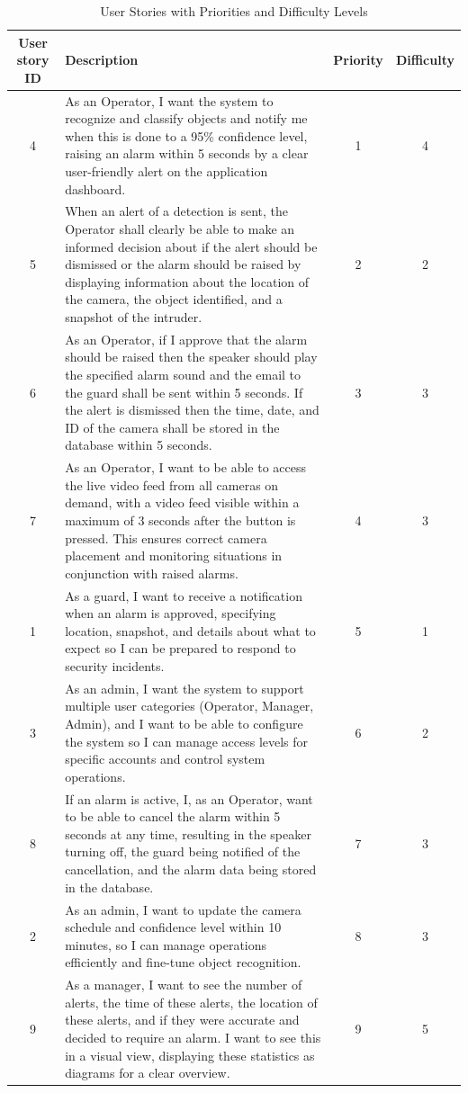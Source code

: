 \documentclass{article}
\begin{document}
\begin{table}[htbp]
\centering
\normalsize
\begin{tabular}{|c|p{10cm}|c|c|}
\hline
\textbf{User story ID} & \textbf{Description} & \textbf{Priority} & \textbf{Difficulty} \\
\hline
4 & As an Operator, I want the system to recognize and classify objects and notify me when this is done to a 95\% confidence level, raising an alarm within 5 seconds by a clear user-friendly alert on the application dashboard. & 1 & 4 \\
\hline
5 & When an alert of a detection is sent, the Operator shall clearly be able to make an informed decision about if the alert should be dismissed or the alarm should be raised by displaying information about the location of the camera, the object identified, and a snapshot of the intruder. & 2 & 2 \\
\hline
6 & As an Operator, if I approve that the alarm should be raised then the speaker should play the specified alarm sound and the email to the guard shall be sent within 5 seconds. If the alert is dismissed then the time, date, and ID of the camera shall be stored in the database within 5 seconds. & 3 & 3 \\
\hline
7 & As an Operator, I want to be able to access the live video feed from all cameras on demand, with a video feed visible within a maximum of 3 seconds after the button is pressed. This ensures correct camera placement and monitoring situations in conjunction with raised alarms. & 4 & 3 \\
\hline
1 & As a guard, I want to receive a notification when an alarm is approved, specifying location, snapshot, and details about what to expect so I can be prepared to respond to security incidents. & 5 & 1 \\
\hline
3 & As an admin, I want the system to support multiple user categories (Operator, Manager, Admin), and I want to be able to configure the system so I can manage access levels for specific accounts and control system operations. & 6 & 2 \\
\hline
8 & If an alarm is active, I, as an Operator, want to be able to cancel the alarm within 5 seconds at any time, resulting in the speaker turning off, the guard being notified of the cancellation, and the alarm data being stored in the database. & 7 & 3 \\
\hline
2 & As an admin, I want to update the camera schedule and confidence level within 10 minutes, so I can manage operations efficiently and fine-tune object recognition. & 8 & 3 \\
\hline
9 & As a manager, I want to see the number of alerts, the time of these alerts, the location of these alerts, and if they were accurate and decided to require an alarm. I want to see this in a visual view, displaying these statistics as diagrams for a clear overview. & 9 & 5 \\
\hline
\end{tabular}
\caption{User Stories with Priorities and Difficulty Levels}
\end{table}
\end{document}
